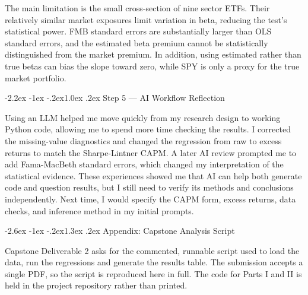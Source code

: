 \documentclass[11pt]{article}
\makeatletter
\renewcommand\section{\@startsection{section}{1}{0pt}%
  {-2.6ex \@plus -1ex \@minus -.2ex}{1.3ex \@plus .2ex}%
  {\normalfont\scshape\large\color{psink}}}   %
\renewcommand\subsection{\@startsection{subsection}{2}{0pt}%
  {-2.2ex \@plus -1ex \@minus -.2ex}{1.0ex \@plus .2ex}%
  {\normalfont\bfseries\normalsize\color{psink}}}
\makeatother
\begin{document}
The main limitation is the small cross-section of nine sector ETFs. Their
relatively similar market exposures limit variation in beta, reducing the
test's statistical power. FMB standard errors are substantially larger than OLS
standard errors, and the estimated beta premium cannot be statistically
distinguished from the market premium. In addition, using estimated rather than
true betas can bias the slope toward zero, while SPY is only a proxy for the
true market portfolio.

\subsection{Step 5 --- AI Workflow Reflection}

Using an LLM helped me move quickly from my research design to working Python
code, allowing me to spend more time checking the results. I corrected the
missing-value diagnostics and changed the regression from raw to excess returns
to match the Sharpe-Lintner CAPM. A later AI review prompted me to add
Fama-MacBeth standard errors, which changed my interpretation of the
statistical evidence. These experiences showed me that AI can help both
generate code and question results, but I still need to verify its methods and
conclusions independently. Next time, I would specify the CAPM form, excess
returns, data checks, and inference method in my initial prompts.


\appendix
\section{Appendix: Capstone Analysis Script}

Capstone Deliverable 2 asks for the commented, runnable script used to load the
data, run the regressions and generate the results table. The submission
accepts a single PDF, so the script is reproduced here in full. The code for
Parts I and II is held in the project repository rather than printed.


\end{document}
